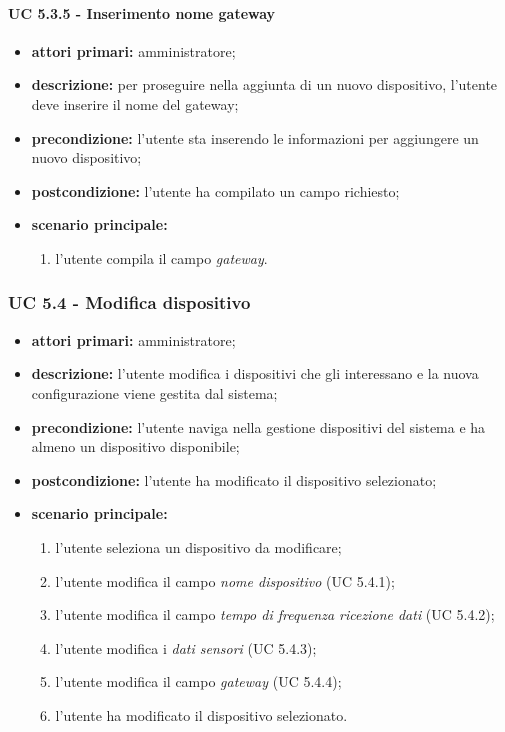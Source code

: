 				\paragraph{UC 5.3.5 - Inserimento nome gateway}
				\begin{itemize}
					\item \textbf{attori primari:} amministratore;
					\item \textbf{descrizione:} per proseguire nella aggiunta di un nuovo dispositivo, l'utente deve inserire il nome del gateway;
					\item \textbf{precondizione:} l'utente sta inserendo le informazioni per aggiungere un nuovo dispositivo;
					\item \textbf{postcondizione:} l'utente ha compilato un campo richiesto;
					\item \textbf{scenario principale:}
					\begin{enumerate}
						\item{l'utente compila il campo \textit{gateway}.}
					\end{enumerate}
				\end{itemize}

			\subsubsection{UC 5.4 - Modifica dispositivo}
			\begin{itemize}
				\item \textbf{attori primari:} amministratore;
				\item \textbf{descrizione:} l'utente modifica i dispositivi che gli interessano e la nuova configurazione viene gestita dal sistema;
				\item \textbf{precondizione:} l'utente naviga nella gestione dispositivi del sistema e ha almeno un dispositivo disponibile;
				\item \textbf{postcondizione:} l'utente ha modificato il dispositivo selezionato;
				\item \textbf{scenario principale:}
				\begin{enumerate}
					\item{l'utente seleziona un dispositivo da modificare;}
					\item{l'utente modifica il campo \textit{nome dispositivo} (UC 5.4.1);}
					\item{l'utente modifica il campo \textit{tempo di frequenza ricezione dati} (UC 5.4.2);}
					\item{l'utente modifica i \textit{dati sensori} (UC 5.4.3);}
					\item{l'utente modifica il campo \textit{gateway} (UC 5.4.4);}
					\item{l'utente ha modificato il dispositivo selezionato.}
				\end{enumerate}
			\end{itemize}

